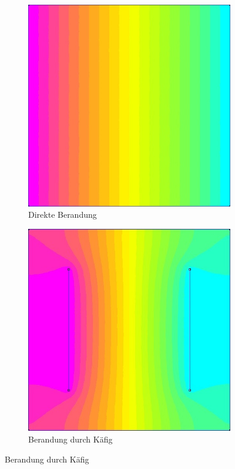 \begin{figure}[h]
\begin{subfigure}[c]{0.38\textwidth}
		\includegraphics[width=\textwidth]{data/KeineRandbedingungen}
		\caption{Direkte Berandung}
		\label{fig:kleinRand}
	\end{subfigure}
	\begin{subfigure}[c]{0.38\textwidth}
		\includegraphics[width=\textwidth]{data/RandGross}
		\caption{Berandung durch Käfig}
		\label{fig:KäfigRand}
	\end{subfigure}
\end{figure}

